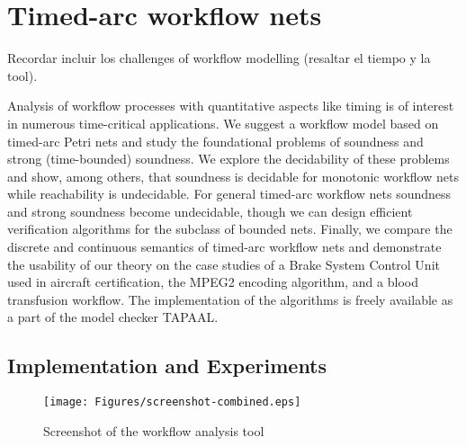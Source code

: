 \chapter{Timed-arc workflow nets}\label{chapter:c5}

Recordar incluir los challenges of workflow modelling (resaltar el tiempo y la tool).

Analysis of workflow processes with quantitative aspects
like timing is of interest in numerous time-critical applications. 
We suggest a workflow model based on timed-arc Petri nets and study
the foundational problems of soundness and strong (time-bounded) soundness.
We explore the decidability of these problems
and show, among others, that soundness is decidable for monotonic 
workflow nets while reachability is undecidable.
For general timed-arc workflow nets soundness and
strong soundness become undecidable, though we can design efficient
verification algorithms for the subclass of bounded nets. 
Finally, we compare the discrete and continuous semantics of timed-arc
workflow nets and demonstrate the usability of our theory on
the case studies of a Brake System Control Unit used in aircraft certification,
the MPEG2 encoding algorithm, and 
a blood transfusion workflow.
The implementation of the algorithms is  
freely available as a part of the model checker TAPAAL.








\section{Implementation and Experiments}

\begin{figure}[t]
\begin{center}
\texttt{[image: Figures/screenshot-combined.eps]}
\end{center}
\caption{Screenshot of the workflow analysis tool}
\label{fig:screenshot}
\end{figure}


